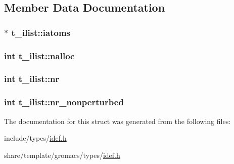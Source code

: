 \subsection{\-Member \-Data \-Documentation}
\hypertarget{structt__ilist_ad8dfbd1f8033ab37ac311f235078c5c8}{
\subsubsection[{iatoms}]{ $\ast$ {\bf t\-\_\-ilist\-::iatoms}}}\label{structt__ilist_ad8dfbd1f8033ab37ac311f235078c5c8}
\hypertarget{structt__ilist_a2e267308cd95280f6a5f4bbe296dacf5}{
\subsubsection[{nalloc}]{\setlength{\rightskip}{0pt plus 5cm}int {\bf t\-\_\-ilist\-::nalloc}}}\label{structt__ilist_a2e267308cd95280f6a5f4bbe296dacf5}
\hypertarget{structt__ilist_a668c23bce84b890f293861e894940ff4}{
\subsubsection[{nr}]{\setlength{\rightskip}{0pt plus 5cm}int {\bf t\-\_\-ilist\-::nr}}}\label{structt__ilist_a668c23bce84b890f293861e894940ff4}
\hypertarget{structt__ilist_a197723fecd0a3fc1698e73364ab2876d}{
\subsubsection[{nr\-\_\-nonperturbed}]{\setlength{\rightskip}{0pt plus 5cm}int {\bf t\-\_\-ilist\-::nr\-\_\-nonperturbed}}}\label{structt__ilist_a197723fecd0a3fc1698e73364ab2876d}


\-The documentation for this struct was generated from the following files\-:\begin{DoxyCompactItemize}
\item 
include/types/\hyperlink{include_2types_2idef_8h}{idef.\-h}\item 
share/template/gromacs/types/\hyperlink{share_2template_2gromacs_2types_2idef_8h}{idef.\-h}\end{DoxyCompactItemize}
